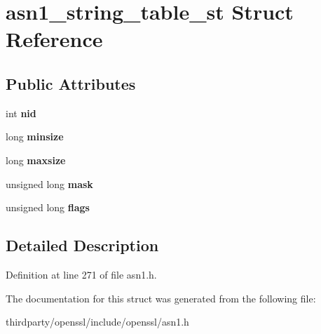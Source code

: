 \hypertarget{structasn1__string__table__st}{}\section{asn1\+\_\+string\+\_\+table\+\_\+st Struct Reference}
\label{structasn1__string__table__st}
\subsection*{Public Attributes}
\begin{DoxyCompactItemize}
\item 
\mbox{\label{structasn1__string__table__st_afc0e790d52b34b5f3705214ee92fa207}} 
int {\bfseries nid}
\item 
\mbox{\label{structasn1__string__table__st_a4428b94f772280133e146a55e2731610}} 
long {\bfseries minsize}
\item 
\mbox{\label{structasn1__string__table__st_a8a4de03a35f1840e86f9aa8ba934a42f}} 
long {\bfseries maxsize}
\item 
\mbox{\label{structasn1__string__table__st_a3dcff470ab384f991b68bbd9f2034d55}} 
unsigned long {\bfseries mask}
\item 
\mbox{\label{structasn1__string__table__st_a37e4651359671ca1bd5b3f8013ca5ef4}} 
unsigned long {\bfseries flags}
\end{DoxyCompactItemize}


\subsection{Detailed Description}


Definition at line 271 of file asn1.\+h.



The documentation for this struct was generated from the following file\+:\begin{DoxyCompactItemize}
\item 
thirdparty/openssl/include/openssl/asn1.\+h\end{DoxyCompactItemize}

